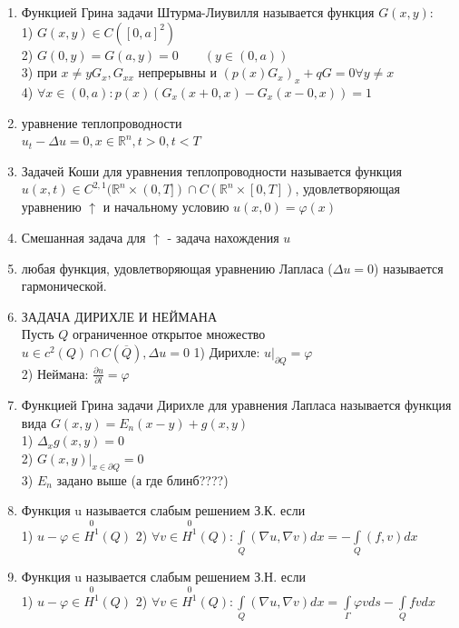 \documentclass[a4paper,12pt]{article}
\newcommand {\pp} {\partial}
\newcommand {\FI} {\varphi}
\newcommand {\iii} {\int\limits}
\begin{document}
\begin{enumerate}
\item Функцией Грина задачи Штурма-Лиувилля называется функция $G(x,y):$\\
1) $G(x,y)\in C([0,a]^2)$\\
2) $G(0,y) = G(a,y) = 0 \quad\quad(y\in(0,a))$\\
3) при $x\ne y G_x, G_{xx}$ непрерывны и $(p(x)G_x)_x + qG = 0\forall y\ne x$\\
4) $\forall x\in(0,a): p(x)(G_x(x+0,x)-G_x(x-0,x))=1$ 
\item уравнение теплопроводности\\
$u_t - \Delta u=0, x\in  \mathbb{R}^n, t > 0, t < T$
\item Задачей Коши для уравнения теплопроводности называется функция $u(x,t)\in C^{2,1}(\mathbb{R}^n\times (0,T])\cap C(\mathbb{R}^n\times [0,T])$, удовлетворяющая уравнению $\uparrow$ и начальному условию $u(x,0)=\FI(x)$
\item Смешанная задача для $\uparrow$ - задача нахождения $u$

\item любая функция, удовлетворяющая уравнению Лапласа ($\Delta u = 0$) называется гармонической.

\item ЗАДАЧА ДИРИХЛЕ И НЕЙМАНА\\
Пусть $Q$ ограниченное открытое множество\\
$u\in c^2(Q)\cap C(\overline{Q}), \Delta u=0$
1) Дирихле: $u|_{\pp Q} = \FI$\\
2) Неймана: $\frac{\pp u}{\pp l}=\FI$


\item Функцией Грина задачи Дирихле для уравнения Лапласа называется функция вида $G(x,y) = E_n(x-y) + g(x,y)$\\
1) $\Delta_xg(x,y)=0$\\
2) $G(x,y)|_{x\in\pp Q} = 0$\\
3) $E_n$ задано выше (а где блинб????)


\item Функция u называется слабым решением З.К. если \\
1) $u -\FI\in \stackrel{0}{H^1}(Q)$
2) $\forall v\in \stackrel{0}{H^1}(Q): \iii_Q (\nabla u, \nabla v)dx = -\iii_Q (f,v)dx$

\item Функция u называется слабым решением З.Н. если \\
1) $u -\FI\in \stackrel{0}{H^1}(Q)$
2) $\forall v\in \stackrel{0}{H^1}(Q): \iii_Q (\nabla u, \nabla v)dx = \iii_\Gamma \FI v ds-\iii_Q fvdx$







\end{enumerate}
\end{document}
